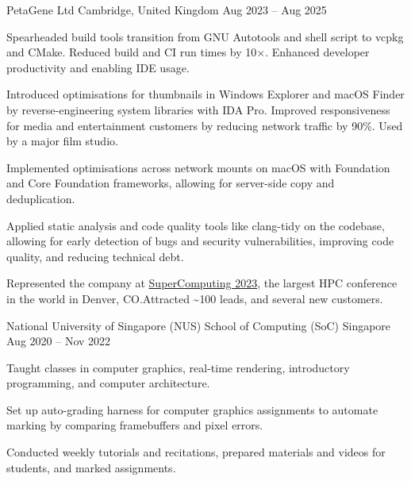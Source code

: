 \begin{cventries}
	{PetaGene Ltd} %
	{Cambridge, United Kingdom} %
	{Aug 2023 -- Aug 2025} %
	{
		\begin{cvitems} %
			\item Spearheaded build tools transition from GNU Autotools and shell script to vcpkg and CMake.
			Reduced build and CI run times by 10\(\times\).
			Enhanced developer productivity and enabling IDE usage.
			\item Introduced optimisations for thumbnails in Windows Explorer and macOS Finder by reverse-engineering system libraries with IDA Pro. Improved responsiveness for media and entertainment customers by reducing network traffic by 90\%. Used by a major film studio.
			\item Implemented optimisations across network mounts on macOS with Foundation and Core Foundation frameworks, allowing for server-side copy and deduplication.
			\item Applied static analysis and code quality tools like clang-tidy on the codebase, allowing for early detection of bugs and security vulnerabilities, improving code quality, and reducing technical debt.
			\item Represented the company at \href{https://hallerickson.ungerboeck.com/prod/app85.cshtml?aat=5663535078317a434974474478437845326c2b766b2b4c562b355033396d433556704e2b3065744c5161773d&ExhibitorID=7040}{SuperComputing 2023}, the largest HPC conference in the world in Denver, CO.\@ Attracted \textasciitilde100 leads, and several new customers.
		\end{cvitems}
	}


	{National University of Singapore (NUS) School of Computing (SoC)} %
	{Singapore} %
	{Aug 2020 -- Nov 2022} %
	{
		\begin{cvitems} %
			\item Taught classes in computer graphics, real-time rendering, introductory programming, and computer architecture.
			\item Set up auto-grading harness for computer graphics assignments to automate marking by comparing framebuffers and pixel errors.
			\item Conducted weekly tutorials and recitations, prepared materials and videos for students, and marked assignments.
		\end{cvitems}
	}


\end{cventries}
